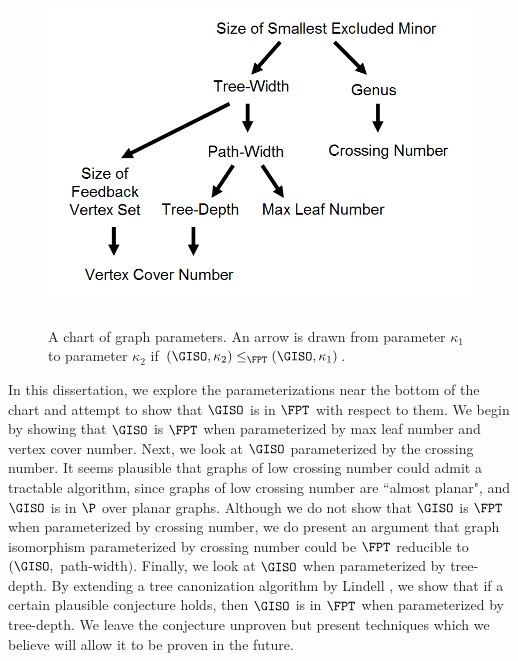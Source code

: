 \documentclass[11pt]{report}
\begin{document}
\newpage

\begin{figure}[h]
\leavevmode
\includegraphics[height=90mm]{parameter_chart_v6.png}
\caption{A chart of graph parameters. An arrow is drawn from parameter $\kappa_1$ to parameter $\kappa_2$ if $(\GISO, \kappa_2) \leq_{\FPT} (\GISO, \kappa_1)$. }
\label{fig:img1}
\end{figure}

In this dissertation, we explore the parameterizations near the bottom of the chart and attempt to show that $\GISO$ is in $\FPT$ with respect to them. We begin by showing that $\GISO$ is $\FPT$ when parameterized by max leaf number and vertex cover number. Next, we look at $\GISO$ parameterized by the crossing number. It seems plausible that graphs of low crossing number could admit a tractable algorithm, since graphs of low crossing number are ``almost planar", and $\GISO$ is in $\P$ over planar graphs. Although we do not show that $\GISO$ is $\FPT$ when parameterized by crossing number, we do present an argument that graph isomorphism parameterized by crossing number could be $\FPT$ reducible to $(\GISO,$ path-width$)$. Finally, we look at $\GISO$ when parameterized by tree-depth. By extending a tree canonization algorithm by Lindell \cite{Lindell92}, we show that if a certain plausible conjecture holds, then $\GISO$ is in $\FPT$ when parameterized by tree-depth. We leave the conjecture unproven but present techniques which we believe will allow it to be proven in the future.
\end{document}
